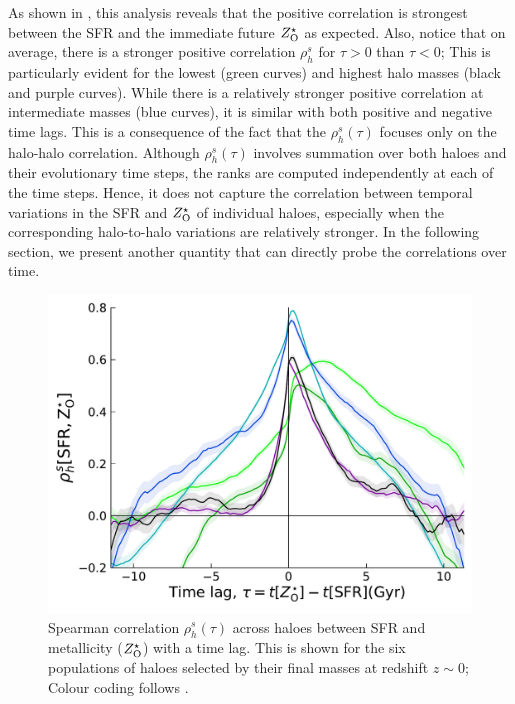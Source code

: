 As shown in , this analysis reveals that the positive correlation is strongest between the SFR and the immediate future $Z^{\star}_{\rm{O}}$ as expected. Also, notice that on average, there is a stronger positive correlation $\rho^s_h$ for $\tau>0$ than $\tau<0$; This is particularly evident for the lowest (green curves) and highest halo masses (black and purple curves).
While there is a relatively stronger positive correlation at intermediate masses (blue curves), it is similar with both positive and negative time lags. This is a consequence of the fact that the $\rho^s_h(\tau)$ focuses only on the halo-halo correlation. Although $\rho^s_h(\tau)$ involves summation over both haloes and their evolutionary time steps, the ranks are computed independently at each of the time steps. Hence, it does not capture the correlation between temporal variations in the SFR and $Z^{\star}_{\rm{O}}$ of individual haloes, especially when the corresponding halo-to-halo variations are relatively stronger. In the following section, we present another quantity that can directly probe the correlations over time.


\begin{figure}[htbp]
\centering
\includegraphics[width=.6\linewidth]{plots/dynam_relxn/Spea_correl_vs_shift_betw_SFR-Z(O)_SFreg_halhalcorr.pdf}
\caption{Spearman correlation $\rho^s_h(\tau)$ across haloes between SFR and metallicity ($Z^{\star}_{\rm{O}}$) with a time lag. This is shown for the six populations of haloes selected by their final masses at redshift $z\sim 0$; Colour coding follows .}
\label{fig:dynam-correl-sfr-ZOsfr-timeshift-func-halhal}
\end{figure}

